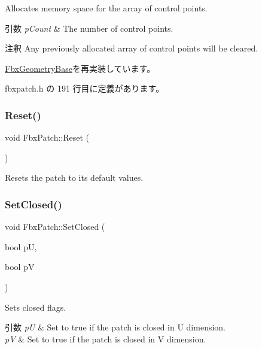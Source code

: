 Allocates memory space for the array of control points. 
\begin{DoxyParams}{引数}
{\em p\+Count} & The number of control points. \\
\hline
\end{DoxyParams}
\begin{DoxyRemark}{注釈}
Any previously allocated array of control points will be cleared. 
\end{DoxyRemark}


\hyperlink{class_fbx_geometry_base_a471b736f2595c006a338c07a61907127}{Fbx\+Geometry\+Base}を再実装しています。



 fbxpatch.\+h の 191 行目に定義があります。

\mbox{\label{class_fbx_patch_a8a1fb844916976ff4e0396e140e30bcf}} 
\subsubsection{\texorpdfstring{Reset()}{Reset()}}
{\footnotesize\ttfamily void Fbx\+Patch\+::\+Reset (\begin{DoxyParamCaption}{ }\end{DoxyParamCaption})}



Resets the patch to its default values. 

\mbox{\label{class_fbx_patch_af3d5e55f5523f2872b7fbb8082200f9b}} 
\subsubsection{\texorpdfstring{Set\+Closed()}{SetClosed()}}
{\footnotesize\ttfamily void Fbx\+Patch\+::\+Set\+Closed (\begin{DoxyParamCaption}\item[{bool}]{pU,  }\item[{bool}]{pV }\end{DoxyParamCaption})}

Sets closed flags. 
\begin{DoxyParams}{引数}
{\em pU} & Set to {\ttfamily true} if the patch is closed in U dimension. \\
\hline
{\em pV} & Set to {\ttfamily true} if the patch is closed in V dimension. \\
\hline
\end{DoxyParams}
\mbox{\label{class_fbx_patch_a43bd49dba561cff8f166b8f7a12816f6}} 
